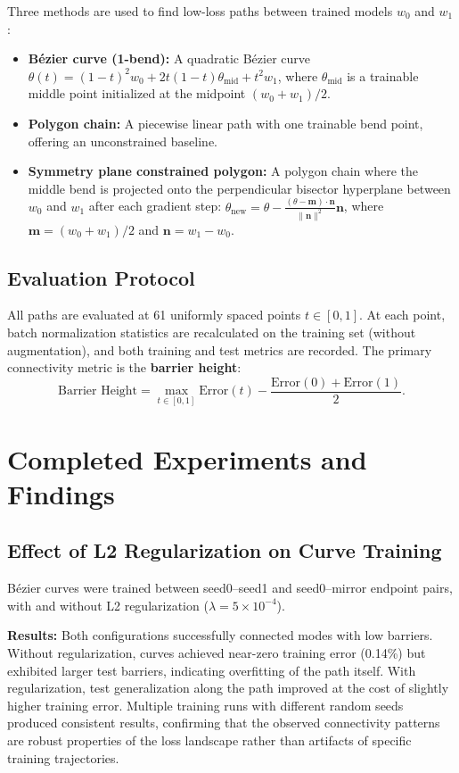 \documentclass[11pt,a4paper]{article}
\begin{document}
Three methods are used to find low-loss paths between trained models $w_0$ and $w_1$:

\begin{itemize}
    \item \textbf{B\'{e}zier curve (1-bend):} A quadratic B\'{e}zier curve $\theta(t) = (1-t)^2 w_0 + 2t(1-t)\theta_{\text{mid}} + t^2 w_1$, where $\theta_{\text{mid}}$ is a trainable middle point initialized at the midpoint $(w_0 + w_1)/2$.
    \item \textbf{Polygon chain:} A piecewise linear path with one trainable bend point, offering an unconstrained baseline.
    \item \textbf{Symmetry plane constrained polygon:} A polygon chain where the middle bend is projected onto the perpendicular bisector hyperplane between $w_0$ and $w_1$ after each gradient step: $\theta_{\text{new}} = \theta - \frac{(\theta - \mathbf{m}) \cdot \mathbf{n}}{\|\mathbf{n}\|^2} \mathbf{n}$, where $\mathbf{m} = (w_0 + w_1)/2$ and $\mathbf{n} = w_1 - w_0$.
\end{itemize}

\subsection{Evaluation Protocol}
\label{sec:evaluation-protocol}

All paths are evaluated at 61 uniformly spaced points $t \in [0, 1]$. At each point, batch normalization statistics are recalculated on the training set (without augmentation), and both training and test metrics are recorded. The primary connectivity metric is the \textbf{barrier height}:
\[
\text{Barrier Height} = \max_{t \in [0,1]} \text{Error}(t) - \frac{\text{Error}(0) + \text{Error}(1)}{2}.
\]

\section{Completed Experiments and Findings}

\subsection{Effect of L2 Regularization on Curve Training}

B\'{e}zier curves were trained between seed0--seed1 and seed0--mirror endpoint pairs, with and without L2 regularization ($\lambda = 5 \times 10^{-4}$).

\textbf{Results:} Both configurations successfully connected modes with low barriers. Without regularization, curves achieved near-zero training error (0.14\%) but exhibited larger test barriers, indicating overfitting of the path itself. With regularization, test generalization along the path improved at the cost of slightly higher training error. Multiple training runs with different random seeds produced consistent results, confirming that the observed connectivity patterns are robust properties of the loss landscape rather than artifacts of specific training trajectories.
\end{document}
